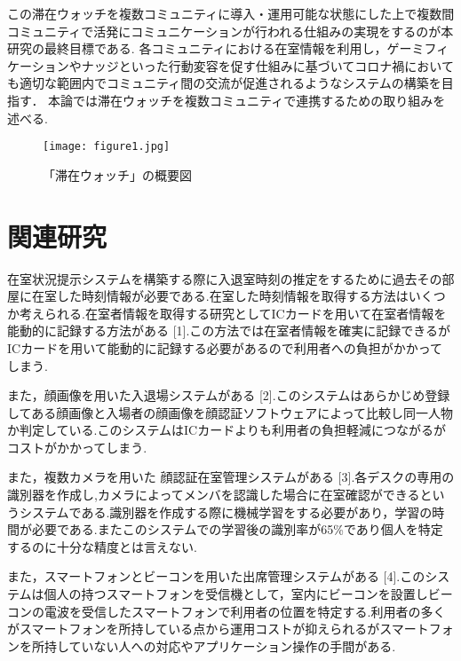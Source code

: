 \documentclass[a4j,8pt,twocolumn]{extarticle}
\begin{document}
この滞在ウォッチを複数コミュニティに導入・運用可能な状態にした上で複数間コミュニティで活発にコミュニケーションが行われる仕組みの実現をするのが本研究の最終目標である.
各コミュニティにおける在室情報を利用し，ゲーミフィケーションやナッジといった行動変容を促す仕組みに基づいてコロナ禍においても適切な範囲内でコミュニティ間の交流が促進されるようなシステムの構築を目指す．
本論では滞在ウォッチを複数コミュニティで連携するための取り組みを述べる.

\begin{figure}[tbh]
    \centering
    \texttt{[image: figure1.jpg]}
    \caption{「滞在ウォッチ」の概要図}
    \label{multipleBPM}
\end{figure}

\section{関連研究}
在室状況提示システムを構築する際に入退室時刻の推定をするために過去その部屋に在室した時刻情報が必要である.在室した時刻情報を取得する方法はいくつか考えられる.在室者情報を取得する研究としてICカードを用いて在室者情報を能動的に記録する方法がある [1].この方法では在室者情報を確実に記録できるがICカードを用いて能動的に記録する必要があるので利用者への負担がかかってしまう.

また，顔画像を用いた入退場システムがある [2].このシステムはあらかじめ登録してある顔画像と入場者の顔画像を顔認証ソフトウェアによって比較し同一人物か判定している.このシステムはICカードよりも利用者の負担軽減につながるがコストがかかってしまう.

また，複数カメラを用いた 顔認証在室管理システムがある [3].各デスクの専用の識別器を作成し,カメラによってメンバを認識した場合に在室確認ができるというシステムである.識別器を作成する際に機械学習をする必要があり，学習の時間が必要である.またこのシステムでの学習後の識別率が65\%であり個人を特定するのに十分な精度とは言えない.

また，スマートフォンとビーコンを用いた出席管理システムがある [4].このシステムは個人の持つスマートフォンを受信機として，室内にビーコンを設置しビーコンの電波を受信したスマートフォンで利用者の位置を特定する.利用者の多くがスマートフォンを所持している点から運用コストが抑えられるがスマートフォンを所持していない人への対応やアプリケーション操作の手間がある.
\end{document}
